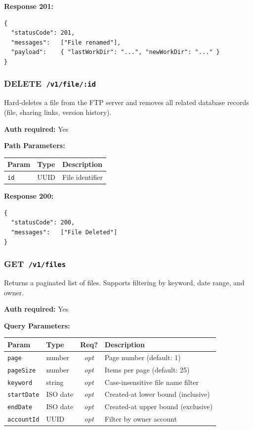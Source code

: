 \documentclass[12pt,a4paper]{article}
\newcommand{\httpget}[1]{%
  \colorbox{getcolor!20}{\textcolor{getcolor}{\textbf{\small GET}}}~\texttt{#1}%
}
\newcommand{\httpdelete}[1]{%
  \colorbox{deletecolor!20}{\textcolor{deletecolor}{\textbf{\small DELETE}}}~\texttt{#1}%
}
\newcommand{\optional}{\textcolor{muted}{\textit{opt}}}
\begin{document}
\textbf{Response 201:}
\begin{lstlisting}
{
  "statusCode": 201,
  "messages":   ["File renamed"],
  "payload":    { "lastWorkDir": "...", "newWorkDir": "..." }
}
\end{lstlisting}

\vspace{0.5em}
\subsubsection{\httpdelete{/v1/file/:id}}

Hard-deletes a file from the FTP server and removes all related database records (file, sharing links, version history).

\textbf{Auth required:} Yes

\textbf{Path Parameters:}

\begin{tabularx}{\linewidth}{llX}
\toprule
\textbf{Param} & \textbf{Type} & \textbf{Description} \\
\midrule
\texttt{id} & UUID & File identifier \\
\bottomrule
\end{tabularx}

\textbf{Response 200:}
\begin{lstlisting}
{
  "statusCode": 200,
  "messages":   ["File Deleted"]
}
\end{lstlisting}

\vspace{0.5em}
\subsubsection{\httpget{/v1/files}}

Returns a paginated list of files. Supports filtering by keyword, date range, and owner.

\textbf{Auth required:} Yes

\textbf{Query Parameters:}

\begin{tabularx}{\linewidth}{llcX}
\toprule
\textbf{Param} & \textbf{Type} & \textbf{Req?} & \textbf{Description} \\
\midrule
\texttt{page}      & number & \optional & Page number (default: 1) \\
\texttt{pageSize}  & number & \optional & Items per page (default: 25) \\
\texttt{keyword}   & string & \optional & Case-insensitive file name filter \\
\texttt{startDate} & ISO date & \optional & Created-at lower bound (inclusive) \\
\texttt{endDate}   & ISO date & \optional & Created-at upper bound (exclusive) \\
\texttt{accountId} & UUID & \optional & Filter by owner account \\
\bottomrule
\end{tabularx}
\end{document}
